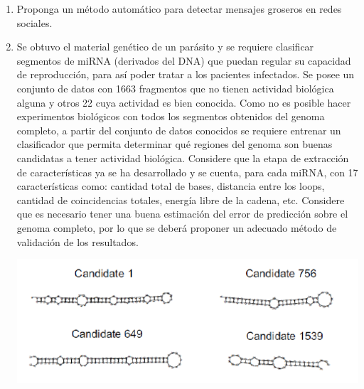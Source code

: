 \documentclass[a4paper,10pt,spanish,oneside]{article}
\begin{document}
\begin{enumerate}
\item Proponga un método automático para detectar mensajes groseros en redes sociales.

\item Se obtuvo el material genético de un parásito y se requiere clasificar segmentos de miRNA (derivados del DNA) que puedan regular su capacidad de reproducción, para así poder tratar a los pacientes infectados. Se posee un conjunto de datos con 1663 fragmentos que no tienen actividad biológica alguna y otros 22 cuya actividad es bien conocida. Como no es posible hacer experimentos biológicos con todos los segmentos obtenidos del genoma completo, a partir del conjunto de datos conocidos se requiere entrenar un clasificador que permita determinar qué regiones del genoma son buenas candidatas a tener actividad biológica. Considere que la etapa de extracción de características ya se ha desarrollado y se cuenta, para cada miRNA, con 17 características como: cantidad total de bases, distancia entre los loops, cantidad de coincidencias totales, energía libre de la cadena, etc. Considere que es necesario tener una buena estimación del error de predicción sobre el genoma completo, por lo que se deberá proponer un adecuado método de validación de los resultados.

\begin{center}
\includegraphics{p6g.pdf}
\end{center}


\end{enumerate}
\end{document}

